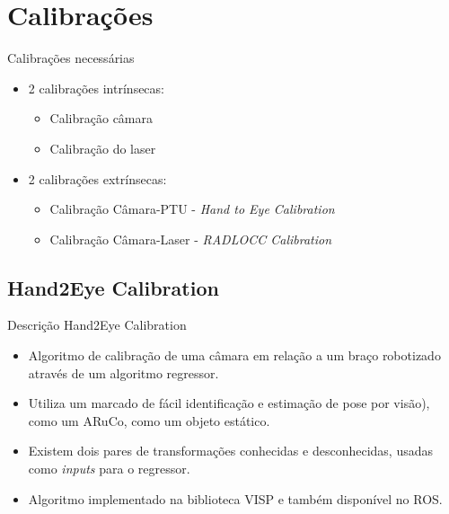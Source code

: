 \section{Calibrações}


\begin{frame}{Calibrações necessárias}
    
    \begin{itemize}
        \item<1-> 2 calibrações intrínsecas:
            \begin{itemize}
                \item<3-> Calibração câmara
                \item<4-> Calibração do laser
            \end{itemize}
        \item<2-> 2 calibrações extrínsecas:
            \begin{itemize}
                \item<5-> Calibração Câmara-PTU - \textit{Hand to Eye Calibration}
                \item<6-> Calibração Câmara-Laser - \textit{RADLOCC Calibration}
            \end{itemize}
    \end{itemize}

\end{frame}

\subsection{Hand2Eye Calibration}


\begin{frame}{Descrição Hand2Eye Calibration}

    \begin{itemize}
        
        \item Algoritmo de calibração de uma câmara em relação a um braço robotizado através de um algoritmo regressor.
        \item Utiliza um marcado de fácil identificação e estimação de pose por visão), como um ARuCo, como um objeto estático.
        \item Existem dois pares de transformações conhecidas e desconhecidas, usadas como \textit{inputs} para o regressor.
        \item Algoritmo implementado na biblioteca VISP e também disponível no ROS.

    \end{itemize}    

\end{frame}

